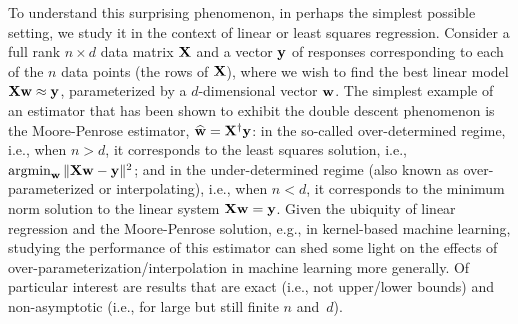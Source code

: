 \documentclass[thesis.tex]{subfiles}
\begin{document}
To understand this
surprising phenomenon, in perhaps the simplest possible setting, we
study it in the context of linear or least squares regression.
Consider a full rank $n\times d$ data matrix $\mathbf X$ and a vector $\mathbf y$ of
responses corresponding to each of the $n$ data points (the rows of $\mathbf X$), where we wish to
find the best linear model $\mathbf X\mathbf w\approx \mathbf y$, parameterized by a
$d$-dimensional vector $\mathbf w$.
The simplest example of an estimator that has been shown to exhibit
the double descent phenomenon \citep{belkin2019two} is the
Moore-Penrose estimator, $\widehat{\mathbf w}=\mathbf X^\dagger\mathbf y$:
in the so-called over-determined regime, i.e., when $n>d$, it corresponds to the
least squares solution, i.e., $\operatorname*{\mathop{\mathrm{argmin}}}_{\mathbf w} \|\mathbf X\mathbf w-\mathbf y\|^2$; and in the
under-determined regime (also known as
over-parameterized or interpolating), i.e., when $n<d$, it
corresponds to the minimum norm solution to the linear system $\mathbf X\mathbf w=\mathbf y$.
Given the ubiquity of linear regression and the Moore-Penrose
solution, e.g., in kernel-based machine learning, studying the
performance of this estimator can shed some light on the effects of
over-parameterization/interpolation in machine learning more generally.
Of particular interest are results that are exact (i.e., not upper/lower bounds) and
non-asymptotic (i.e., for large but still finite $n$ and~$d$).
\end{document}

